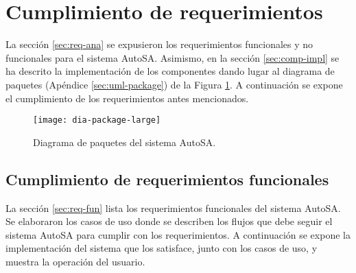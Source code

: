 \section{Cumplimiento de requerimientos}
La sección \ref{sec:req-ana} se expusieron los requerimientos funcionales y no funcionales para el sistema AutoSA. Asimismo, en la sección \ref{sec:comp-impl} se ha descrito la implementación de los componentes dando lugar al diagrama de paquetes (Apéndice \ref{sec:uml-package}) de la Figura \ref{fig:dia-package-large}. A continuación se expone el cumplimiento de los requerimientos antes mencionados.

\begin{figure}[h]
	\centering
	\texttt{[image: dia-package-large]}
	\caption{Diagrama de paquetes del sistema AutoSA.}
	\label{fig:dia-package-large}
\end{figure}


\subsection{Cumplimiento de requerimientos funcionales}
La sección \ref{sec:req-fun} lista los requerimientos funcionales del sistema AutoSA. Se elaboraron los casos de uso donde se describen los flujos que debe seguir el sistema AutoSA para cumplir con los requerimientos. A continuación se expone la implementación del sistema que los satisface, junto con los casos de uso, y muestra la operación del usuario.

